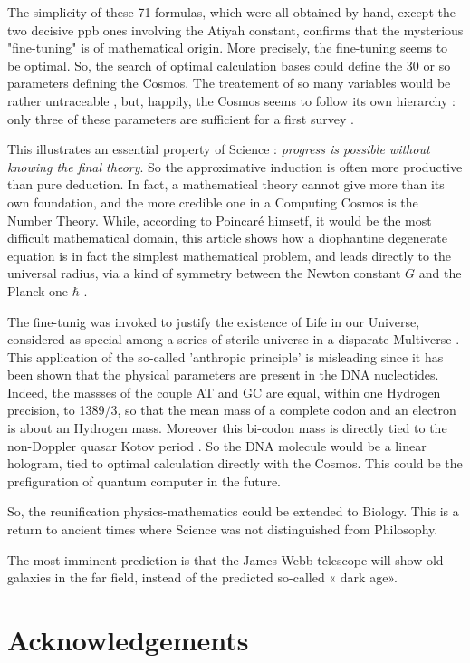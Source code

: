 \documentclass[a4paper,9pt]{article}
\begin{document}
The simplicity of these 71 formulas, which were all obtained by hand, except the two decisive ppb ones involving the Atiyah constant, confirms that the mysterious "fine-tuning" is of mathematical origin. More precisely, the fine-tuning seems to be optimal. So, the search of optimal calculation bases could define the 30 or so parameters defining the Cosmos. The treatement of so many variables would be rather untraceable , but, happily, the Cosmos seems to follow its own hierarchy : only three of these parameters are sufficient for a first survey \cite{Carr}. 


This illustrates an essential property of Science : \textit{progress is possible without knowing the final theory}. So the approximative induction is often more productive than pure deduction. In fact, a mathematical theory cannot give more than its own foundation, and the more credible one in a Computing Cosmos is the Number Theory. While, according to Poincar\'e himsetf, it would be the most difficult mathematical domain, this article shows how a diophantine degenerate equation is in fact the simplest mathematical problem, and leads directly to the universal radius, via a kind of symmetry between the Newton constant $G$ and the Planck one $\hbar$ .   


The fine-tunig was invoked to justify the existence of Life in our Universe, considered as special among a series of sterile universe in a disparate Multiverse \cite{Carr}. This application of the so-called 'anthropic principle' is misleading since it has been shown that the physical parameters are present in the DNA nucleotides. Indeed, the massses of the couple AT and GC are equal, within one Hydrogen precision, to 1389/3, so that the mean mass of a complete codon and an electron is about an Hydrogen mass. Moreover this bi-codon mass is directly tied to the non-Doppler quasar Kotov period \cite{Sanchez3}. So the DNA molecule would be a linear hologram, tied to optimal calculation directly with the Cosmos. This could be the prefiguration of quantum computer in the future.


So, the reunification physics-mathematics could be extended to Biology. This is a return to ancient times where Science was not distinguished from Philosophy.


The most imminent prediction is that the James Webb telescope will show old galaxies in the far field, instead of the predicted so-called « dark age».

\section {Acknowledgements}
\end{document}
